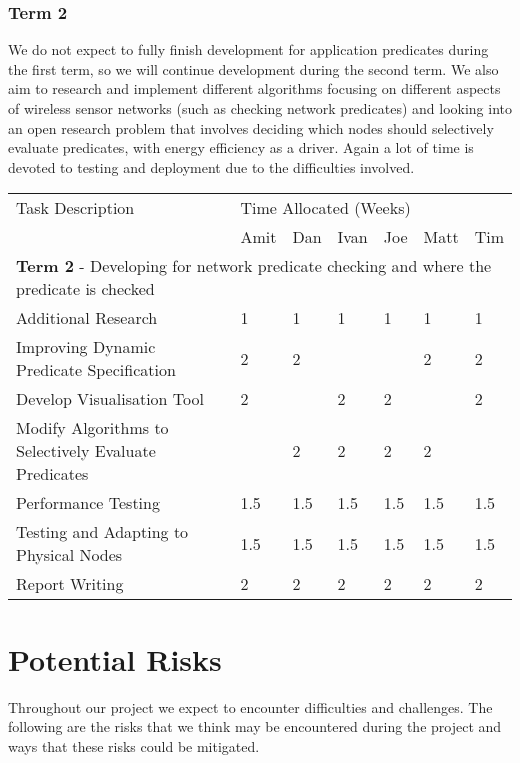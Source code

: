 \documentclass[a4paper]{article}
\begin{document}
\subsubsection{Term 2}

We do not expect to fully finish development for application predicates during
the first term, so we will continue development during the second term. We also
aim to research and implement different algorithms focusing on different aspects
of wireless sensor networks (such as checking network predicates) and looking into an
open research problem that involves deciding which nodes should selectively evaluate predicates,
with energy efficiency as a driver. Again a lot of time is devoted to testing and
deployment due to the difficulties involved.

\begin{table}[H]
	\centering
	\begin{tabular}{| l | l | l | l | l | l | l |}
	\hline
	Task Description & \multicolumn{6}{|l|}{Time Allocated (Weeks)}\\
	~ & Amit & Dan & Ivan & Joe & Matt & Tim \\
	\hline
	\hline
	\multicolumn{7}{|l|}{\textbf{Term 2} - Developing for network predicate checking and where the predicate is checked} \\
	\hline
	
	Additional Research & 1 & 1 & 1 & 1 & 1 & 1\\
	Improving Dynamic Predicate Specification & 2 & 2 & ~ & ~ & 2 & 2\\
	Develop Visualisation Tool & 2 & ~ & 2 & 2 & ~ & 2\\
	Modify Algorithms to Selectively Evaluate Predicates & ~ & 2 & 2 & 2 & 2 & ~\\
	Performance Testing & 1.5 & 1.5 & 1.5 & 1.5 & 1.5 & 1.5\\
	Testing and Adapting to Physical Nodes & 1.5 & 1.5 & 1.5 & 1.5 & 1.5 & 1.5\\
	Report Writing & 2 & 2 & 2 & 2 & 2 & 2\\
	
	\hline
	
	\end{tabular}
\end{table}


\section{Potential Risks}

Throughout our project we expect to encounter difficulties and challenges. The
following are the risks that we think may be encountered during the project and
ways that these risks could be mitigated.
\end{document}
